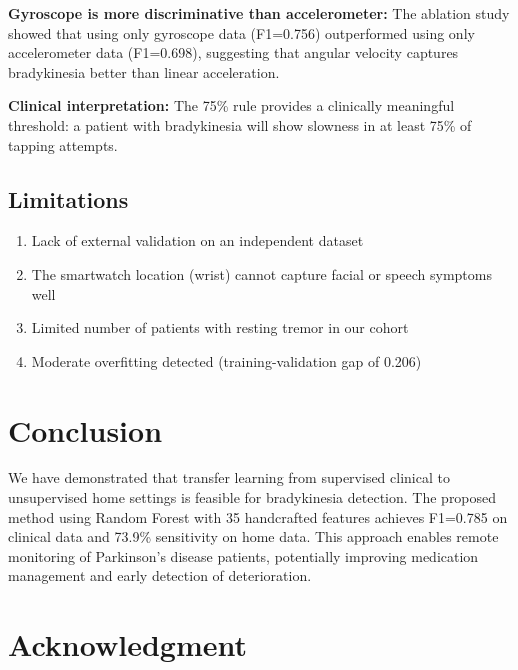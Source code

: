 \documentclass{article}
\begin{document}
\textbf{Gyroscope is more discriminative than accelerometer:} The ablation study showed that using only gyroscope data (F1=0.756) outperformed using only accelerometer data (F1=0.698), suggesting that angular velocity captures bradykinesia better than linear acceleration.

\textbf{Clinical interpretation:} The 75\% rule provides a clinically meaningful threshold: a patient with bradykinesia will show slowness in at least 75\% of tapping attempts.

\subsection{Limitations}

\begin{enumerate}
    \item Lack of external validation on an independent dataset
    \item The smartwatch location (wrist) cannot capture facial or speech symptoms well
    \item Limited number of patients with resting tremor in our cohort
    \item Moderate overfitting detected (training-validation gap of 0.206)
\end{enumerate}

\section{Conclusion}

We have demonstrated that transfer learning from supervised clinical to unsupervised home settings is feasible for bradykinesia detection. The proposed method using Random Forest with 35 handcrafted features achieves F1=0.785 on clinical data and 73.9\% sensitivity on home data. This approach enables remote monitoring of Parkinson's disease patients, potentially improving medication management and early detection of deterioration.

\section*{Acknowledgment}
\end{document}
